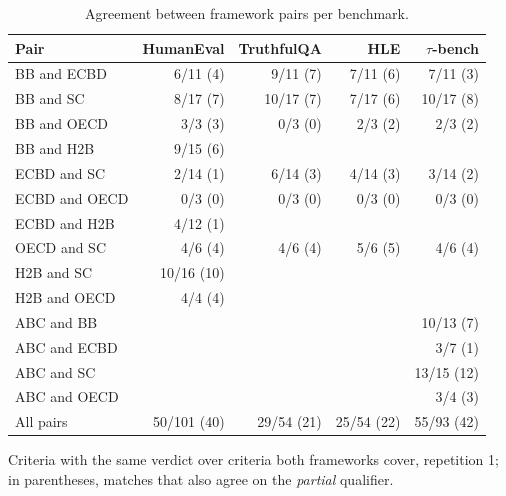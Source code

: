 \documentclass[10pt,conference]{IEEEtran}
\begin{document}
\begin{table}[t]
\caption{Agreement between framework pairs per benchmark.}
\label{tab:pairwise}
\centering
\footnotesize\begin{tabular}{@{}lrrrr@{}}\toprule
\textbf{Pair} & \textbf{HumanEval} & \textbf{TruthfulQA} & \textbf{HLE} & \textbf{$\tau$-bench} \\
\midrule
BB and ECBD & 6/11 (4) & 9/11 (7) & 7/11 (6) & 7/11 (3) \\
BB and SC & 8/17 (7) & 10/17 (7) & 7/17 (6) & 10/17 (8) \\
BB and OECD & 3/3 (3) & 0/3 (0) & 2/3 (2) & 2/3 (2) \\
BB and H2B & 9/15 (6) &  &  &  \\
\midrule
ECBD and SC & 2/14 (1) & 6/14 (3) & 4/14 (3) & 3/14 (2) \\
ECBD and OECD & 0/3 (0) & 0/3 (0) & 0/3 (0) & 0/3 (0) \\
ECBD and H2B & 4/12 (1) &  &  &  \\
\midrule
OECD and SC & 4/6 (4) & 4/6 (4) & 5/6 (5) & 4/6 (4) \\
\midrule
H2B and SC & 10/16 (10) &  &  &  \\
H2B and OECD & 4/4 (4) &  &  &  \\
\midrule
ABC and BB &  &  &  & 10/13 (7) \\
ABC and ECBD &  &  &  & 3/7 (1) \\
ABC and SC &  &  &  & 13/15 (12) \\
ABC and OECD &  &  &  & 3/4 (3) \\
\midrule
All pairs & 50/101 (40) & 29/54 (21) & 25/54 (22) & 55/93 (42) \\
\bottomrule\end{tabular}
\par\vspace{2pt}\raggedright\footnotesize Criteria with the same verdict over criteria both frameworks cover, repetition 1; in parentheses, matches that also agree on the \emph{partial} qualifier.
\end{table}
\end{document}
